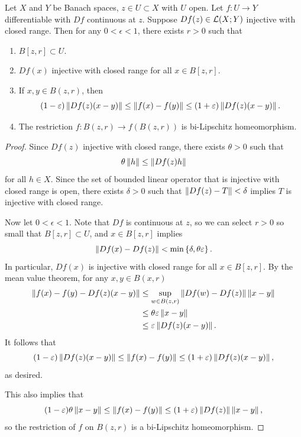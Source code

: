 \documentclass[a4paper]{article}
\begin{document}
\begin{thm}
  Let $X$ and $Y$ be Banach spaces, $z \in U \subset X$
  with $U$ open. Let $f: U \to Y$ differentiable with
  $Df$ continuous at $z$. Suppose $Df(z) \in \mathcal{L}(X; Y)$
  injective with closed range. Then for any $0 < \epsilon < 1$,
  there exists $r > 0$ such that
  \begin{enumerate}
    \item $B[z, r] \subset U$.
    \item $Df(x)$ injective with closed range for all $x \in
            B[z, r]$.
    \item If $x, y \in B(z, r)$, then
          \[
            (1 - \varepsilon) \left\lVert Df(z) (x - y)\right\rVert
            \leq \left\lVert f(x) - f(y)\right\rVert
            \leq (1 + \varepsilon) \left\lVert Df(z) (x - y)\right\rVert.
          \]
    \item The restriction $f: B(z, r) \to f(B(z, r))$ is bi-Lipschitz
          homeomorphism.
  \end{enumerate}
\end{thm}

\begin{proof}

  Since $Df(z)$ injective with closed range, there exists $\theta > 0$
  such that
  \[
    \theta \left\lVert h\right\rVert \leq \left\lVert Df(z) h\right\rVert
  \]
  for all $h \in X$. Since the set of bounded linear operator that is
  injective with closed range is open, there exists $\delta > 0$ such that
  $\left\lVert Df(z) - T\right\rVert < \delta$ implies $T$ is injective with closed range.

  Now let $0 < \epsilon < 1$. Note that $Df$ is continuous at $z$, so we
  can select $r > 0$ so small that $B[z, r] \subset U$, and $x \in B[z,
  r]$ implies
  \[
    \left\lVert Df(x) - Df(z)\right\rVert < \min \left\{ \delta, \theta \varepsilon \right\}.
  \]
  In particular, $Df(x)$ is injective with closed range for all $x \in
  B[z, r]$. By the mean value theorem, for any $x, y \in B(x, r)$
  \[
    \begin{aligned}
      \left\lVert f(x) - f(y) - Df(z) (x - y)\right\rVert
       & \leq \sup_{w \in B(z, r)} \left\lVert Df(w) - Df(z)\right\rVert \left\lVert x - y\right\rVert \\
       & \leq \theta \varepsilon \left\lVert x - y\right\rVert                           \\
       & \leq \varepsilon \left\lVert Df(z) (x - y)\right\rVert.
    \end{aligned}
  \]
  It follows that
  \[
    (1 - \varepsilon) \left\lVert Df(z)(x - y)\right\rVert
    \leq \left\lVert f(x) - f(y)\right\rVert
    \leq (1 + \varepsilon) \left\lVert Df(z) (x - y)\right\rVert,
  \]
  as desired.

  This also implies that
  \[
    (1 - \varepsilon) \theta \left\lVert x - y\right\rVert
    \leq \left\lVert f(x) - f(y)\right\rVert \leq (1 + \varepsilon)
    \left\lVert Df(z)\right\rVert \left\lVert x - y\right\rVert,
  \]
  so the restriction of $f$ on $B(z, r)$ is a bi-Lipschitz homeomorphism.

\end{proof}
\end{document}
